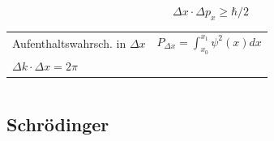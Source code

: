 \documentclass[12pt,a4paper]{article}
\renewcommand{\=}[1]{\stackrel{#1}{=}}
\theoremstyle{definition}
\theoremstyle{remark}
\begin{document}
\begin{framed}
$$\Delta x \cdot \Delta p_x \geq \hbar/2$$
\end{framed}

\begin{center}
\begin{minipage}[t]{.35\linewidth}
\vspace{0pt}
\noindent\begin{tabular}{ll}
\toprule
Aufenthaltswahrsch. in $\Delta x$ & $P_{\Delta x} = \int_{x_0}^{x_1} \psi^2(x) dx$\\
$\Delta k \cdot \Delta x = 2\pi$\\
\bottomrule
\end{tabular}
\end{minipage}%
\begin{minipage}[t]{.65\linewidth}
\vspace{0pt}
\begin{tabular}{ll}
\toprule

\end{tabular}
\end{minipage}
\end{center}


\subsection{Schrödinger}
\end{document}
